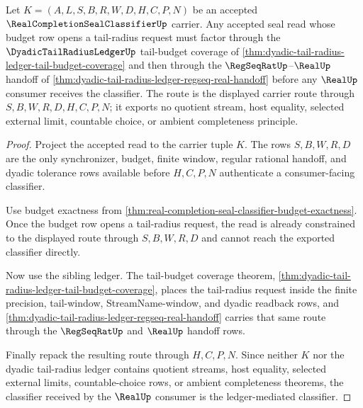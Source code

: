 \begin{theorem}
\label{thm:real-completion-seal-classifier-tail-radius-handoff}
Let $K=(A,L,S,B,R,W,D,H,C,P,N)$ be an accepted $\RealCompletionSealClassifierUp$ carrier. Any accepted seal read whose budget row opens a tail-radius request must factor through the $\DyadicTailRadiusLedgerUp$ tail-budget coverage of \autoref{thm:dyadic-tail-radius-ledger-tail-budget-coverage} and then through the $\RegSeqRatUp$--$\RealUp$ handoff of \autoref{thm:dyadic-tail-radius-ledger-regseq-real-handoff} before any $\RealUp$ consumer receives the classifier. The route is the displayed carrier route through $S,B,W,R,D,H,C,P,N$; it exports no quotient stream, host equality, selected external limit, countable choice, or ambient completeness principle.
\end{theorem}
\begin{proof}
Project the accepted read to the carrier tuple $K$. The rows $S,B,W,R,D$ are the only synchronizer, budget, finite window, regular rational handoff, and dyadic tolerance rows available before $H,C,P,N$ authenticate a consumer-facing classifier.

Use budget exactness from \autoref{thm:real-completion-seal-classifier-budget-exactness}. Once the budget row opens a tail-radius request, the read is already constrained to the displayed route through $S,B,W,R,D$ and cannot reach the exported classifier directly.

Now use the sibling ledger. The tail-budget coverage theorem, \autoref{thm:dyadic-tail-radius-ledger-tail-budget-coverage}, places the tail-radius request inside the finite precision, tail-window, StreamName-window, and dyadic readback rows, and \autoref{thm:dyadic-tail-radius-ledger-regseq-real-handoff} carries that same route through the $\RegSeqRatUp$ and $\RealUp$ handoff rows.

Finally repack the resulting route through $H,C,P,N$. Since neither $K$ nor the dyadic tail-radius ledger contains quotient streams, host equality, selected external limits, countable-choice rows, or ambient completeness theorems, the classifier received by the $\RealUp$ consumer is the ledger-mediated classifier.
\end{proof}

